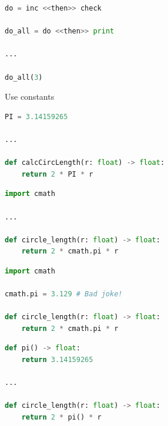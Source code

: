 \documentclass[aspectratio=169]{beamer}
\begin{document}
\begin{frame}[fragile,t]
    \begin{lstlisting}[language=Python]
do = inc <<then>> check

do_all = do <<then>> print

...

do_all(3)
    \end{lstlisting}
\end{frame}

\begin{frame}
    \centering
        \Huge{Use  constants}
\end{frame}

\begin{frame}[fragile,t]
    \begin{lstlisting}[language=Python]
PI = 3.14159265

...

def calcCircLength(r: float) -> float:
    return 2 * PI * r
    \end{lstlisting}
\end{frame}

\begin{frame}[fragile,t]
    \begin{lstlisting}[language=Python]
import cmath

...

def circle_length(r: float) -> float:
    return 2 * cmath.pi * r
    \end{lstlisting}
\end{frame}

\begin{frame}[fragile,t]
    \begin{lstlisting}[language=Python]
import cmath

cmath.pi = 3.129 # Bad joke!

def circle_length(r: float) -> float:
    return 2 * cmath.pi * r
    \end{lstlisting}
\end{frame}

\begin{frame}[fragile,t]
    \begin{lstlisting}[language=Python]
def pi() -> float:
    return 3.14159265

...

def circle_length(r: float) -> float:
    return 2 * pi() * r
    \end{lstlisting}
\end{frame}

\begin{frame}
    \centering
\end{frame}
\end{document}
